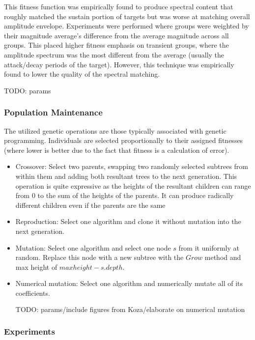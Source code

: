 \documentclass[12pt]{article}
\begin{document}
This fitness function was empirically found to produce spectral content that roughly matched the sustain portion of targets but was worse at matching overall amplitude envelope. Experiments were performed where groups were weighted by their magnitude average's difference from the average magnitude across all groups. This placed higher fitness emphasis on transient groups, where the amplitude spectrum was the most different from the average (usually the attack/decay periods of the target). However, this technique was empirically found to lower the quality of the spectral matching.

TODO: params
\subsubsection{Population Maintenance}\label{TMMAINTENANCE}
The utilized genetic operations are those typically associated with genetic programming. Individuals are selected proportionally to their assigned fitnesses (where lower is better due to the fact that fitness is a calculation of error).
\begin{itemize}
\item
Crossover: Select two parents, swapping two randomly selected subtrees from within them and adding both resultant trees to the next generation. This operation is quite expressive as the heights of the resultant children can range from 0 to the sum of the heights of the parents. It can produce radically different children even if the parents are the same
\item
Reproduction: Select one algorithm and clone it without mutation into the next generation.
\item
Mutation: Select one algorithm and select one node $s$ from it uniformly at random. Replace this node with a new subtree with the $Grow$ method and max height of $maxheight - s.depth$.
\item
Numerical mutation: Select one algorithm and numerically mutate all of its coefficients.

TODO: params/include figures from Koza/elaborate on numerical mutation
\end{itemize}
\subsubsection{Experiments}\label{TMEXPERIMENTS}
\begin{comment}
Ideally one would ``clean'' the WAV file as much as possible by removing areas of silence, removing any DC offset and normalizing.
\end{comment}
\end{document}
